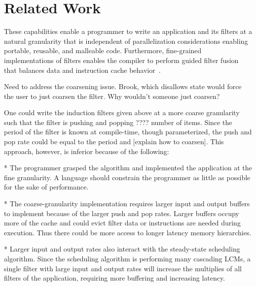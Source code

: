 \section{Related Work}


These capabilities enable a programmer to write an application and its
filters at a natural granularity that is independent of
parallelization considerations enabling portable, reusable, and
malleable code.  Furthermore, fine-grained implementations of filters
enables the compiler to perform guided filter fusion that balances
data and instruction cache behavior~\cite{sermulins-lctes05}.


Need to address the coarsening issue.  Brook, which disallows state
would force the user to just coarsen the filter.  Why wouldn't someone
just coarsen?  


One could write the induction filters given above at a more coarse granularity
such that the filter is pushing and popping ???? number of items.
Since the period of the filter is known at compile-time, though
parameterized, the push and pop rate could be equal to the period and
[explain how to coarsen].  This approach, however, is inferior because
of the following:

* The programmer grasped the algorithm and implemented the application
at the fine granularity.  A language should constrain the programmer
as little as possible for the sake of performance.

* The coarse-granularity implementation requires larger input and
output buffers to implement because of the larger push and pop rates.
Larger buffers occupy more of the cache and could evict filter data or
instructions are needed during execution.  Thus there could be more
access to longer latency memory hierarchies.

* Larger input and output rates also interact with the steady-state
scheduling algorithm.  Since the scheduling algorithm is performing
many cascading LCMs, a single filter with large input and output rates
will increase the multiplies of all filters of the application,
requiring more buffering and increasing latency.
